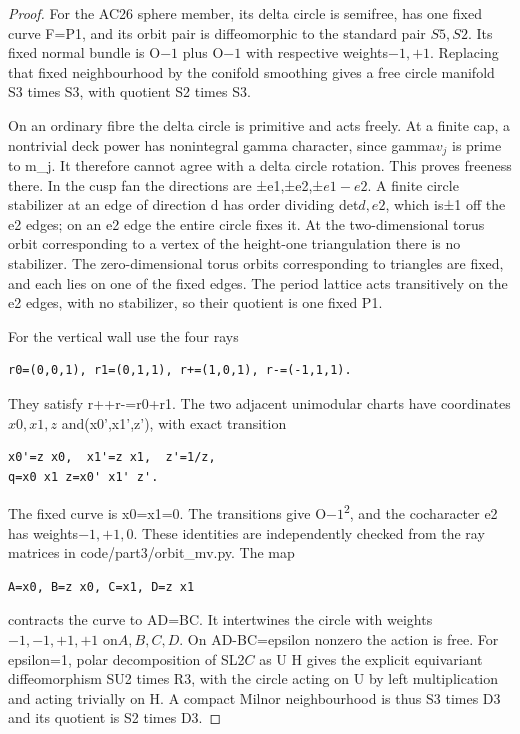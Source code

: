 \begin{proof}
For the AC26 sphere member, its delta circle is semifree, has one fixed curve F=P1, and its orbit pair is diffeomorphic to the standard pair \(S5,S2\). Its fixed normal bundle is O\(-1\) plus O\(-1\) with respective weights\(-1,+1\). Replacing that fixed neighbourhood by the conifold smoothing gives a free circle manifold S3 times S3, with quotient S2 times S3.

On an ordinary fibre the delta circle is primitive and acts freely. At a finite cap, a nontrivial deck power has nonintegral gamma character, since gamma\(v_j\) is prime to m\_j. It therefore cannot agree with a delta circle rotation. This proves freeness there. In the cusp fan the directions are ±e1,±e2,±\(e1-e2\). A finite circle stabilizer at an edge of direction d has order dividing det\(d,e2\), which is±1 off the e2 edges; on an e2 edge the entire circle fixes it. At the two-dimensional torus orbit corresponding to a vertex of the height-one triangulation there is no stabilizer. The zero-dimensional torus orbits corresponding to triangles are fixed, and each lies on one of the fixed edges. The period lattice acts transitively on the e2 edges, with no stabilizer, so their quotient is one fixed P1.

For the vertical wall use the four rays

\begin{lstlisting}
r0=(0,0,1), r1=(0,1,1), r+=(1,0,1), r-=(-1,1,1).
\end{lstlisting}

They satisfy r++r-=r0+r1. The two adjacent unimodular charts have coordinates\(x0,x1,z\) and(x0',x1',z'), with exact transition

\begin{lstlisting}
x0'=z x0,  x1'=z x1,  z'=1/z,
q=x0 x1 z=x0' x1' z'.
\end{lstlisting}

The fixed curve is x0=x1=0. The transitions give O\(-1\)\textsuperscript{2}, and the cocharacter e2 has weights\(-1,+1,0\). These identities are independently checked from the ray matrices in code/part3/orbit\_mv.py. The map

\begin{lstlisting}
A=x0, B=z x0, C=x1, D=z x1
\end{lstlisting}

contracts the curve to AD=BC. It intertwines the circle with weights \(-1,-1,+1,+1\) on\(A,B,C,D\). On AD-BC=epsilon nonzero the action is free. For epsilon=1, polar decomposition of SL2\(C\) as U H gives the explicit equivariant diffeomorphism SU2 times R3, with the circle acting on U by left multiplication and acting trivially on H. A compact Milnor neighbourhood is thus S3 times D3 and its quotient is S2 times D3.


\end{proof}
